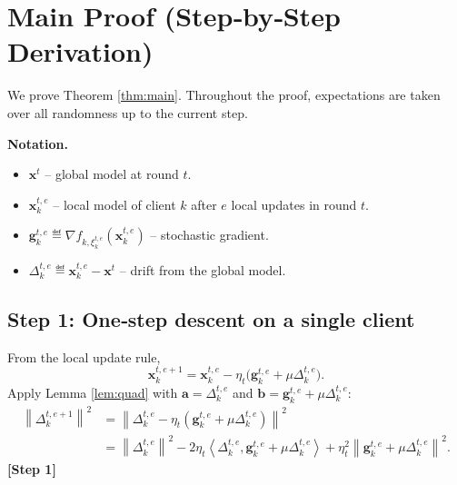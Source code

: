 \documentclass{article}
\newcommand{\norm}[1]{\left\lVert #1 \right\rVert}
\newcommand{\inner}[2]{\left\langle #1,#2 \right\rangle}
\begin{document}
\section*{Main Proof (Step‑by‑Step Derivation)}
We prove Theorem \ref{thm:main}.  Throughout the proof, expectations are taken over all randomness up to the current step.

\noindent\textbf{Notation.}
\begin{itemize}
\item $\mathbf{x}^{t}$ – global model at round $t$.
\item $\mathbf{x}_{k}^{t,e}$ – local model of client $k$ after $e$ local updates in round $t$.
\item $\mathbf{g}_{k}^{t,e}\eqdef\nabla f_{k,\xi_{k}^{t,e}}(\mathbf{x}_{k}^{t,e})$ – stochastic gradient.
\item $\Delta_{k}^{t,e}\eqdef\mathbf{x}_{k}^{t,e}-\mathbf{x}^{t}$ – drift from the global model.
\end{itemize}

\subsection*{Step 1: One‑step descent on a single client}
From the local update rule,
\[
\mathbf{x}_{k}^{t,e+1}
=
\mathbf{x}_{k}^{t,e}
-\eta_t\bigl(\mathbf{g}_{k}^{t,e}+\mu\Delta_{k}^{t,e}\bigr).
\]
Apply Lemma \ref{lem:quad} with $\mathbf{a}=\Delta_{k}^{t,e}$ and $\mathbf{b}=\mathbf{g}_{k}^{t,e}+\mu\Delta_{k}^{t,e}$:
\begin{align}
\norm{\Delta_{k}^{t,e+1}}^{2}
&=\norm{\Delta_{k}^{t,e}-\eta_t(\mathbf{g}_{k}^{t,e}+\mu\Delta_{k}^{t,e})}^{2}\nonumber\\
&=\norm{\Delta_{k}^{t,e}}^{2}
-2\eta_t\inner{\Delta_{k}^{t,e}}{\mathbf{g}_{k}^{t,e}+\mu\Delta_{k}^{t,e}}
+\eta_t^{2}\norm{\mathbf{g}_{k}^{t,e}+\mu\Delta_{k}^{t,e}}^{2}.
\tag{2}
\end{align}
\noindent\textbf{[Step 1]}
\end{document}
